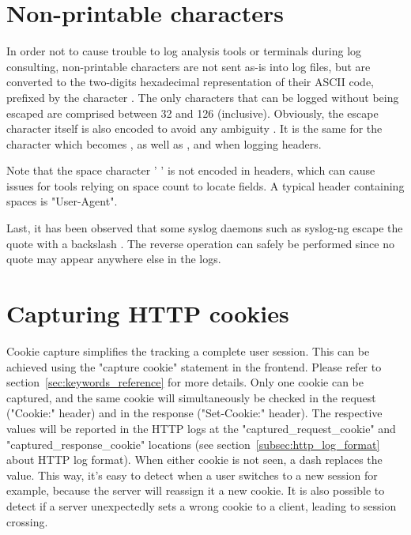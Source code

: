 \section{Non-printable characters}
\label{sec:non_printable_characters}

In order not to cause trouble to log analysis tools or terminals during log
consulting, non-printable characters are not sent as-is into log files, but are
converted to the two-digits hexadecimal representation of their ASCII code,
prefixed by the character \chr{\#}. The only characters that can be logged without
being escaped are comprised between 32 and 126 (inclusive). Obviously, the
escape character \chr{\#} itself is also encoded to avoid any ambiguity . It
is the same for the character  which becomes , as well as \chr{\{}, \chr{|} and
\chr{\}} when logging headers.

Note that the space character ' ' is not encoded in headers, which can cause
issues for tools relying on space count to locate fields. A typical header
containing spaces is "User-Agent".

Last, it has been observed that some syslog daemons such as syslog-ng escape
the quote  with a backslash \chr{\bslash}. The reverse operation can safely be
performed since no quote may appear anywhere else in the logs.

\section{Capturing HTTP cookies}
\label{sec:capturing_http_cookies}

Cookie capture simplifies the tracking a complete user session. This can be
achieved using the "capture cookie" statement in the frontend. Please refer to
section~\ref{sec:keywords_reference} for more details. Only one cookie can be captured, and the same
cookie will simultaneously be checked in the request ("Cookie:" header) and in
the response ("Set-Cookie:" header). The respective values will be reported in
the HTTP logs at the "captured\_request\_cookie" and "captured\_response\_cookie"
locations (see section~\ref{subsec:http_log_format} about HTTP log format). When either cookie is
not seen, a dash \chr{-} replaces the value. This way, it's easy to detect when a
user switches to a new session for example, because the server will reassign it
a new cookie. It is also possible to detect if a server unexpectedly sets a
wrong cookie to a client, leading to session crossing.

